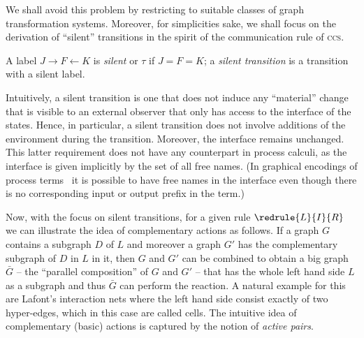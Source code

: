 We shall avoid this problem by restricting to suitable classes of graph transformation systems. 
Moreover, 
for simplicities sake, 
we shall focus on the derivation of ``silent'' transitions
in the spirit of the communication rule of \textsc{ccs}. 
\begin{definition}
  A label $J \to F \gets K$ is \emph{silent} or $\tau$
  if $J = F = K$;
  a \emph{silent transition} is a transition with a silent label. 
\end{definition}
  Intuitively, 
  a silent transition is one that does not induce any ``material''
  change that is visible to an external observer
  that only has access to  the interface of the states. 
  Hence, 
  in particular, 
  a silent transition does not involve additions of the environment
  during the transition.
  Moreover, 
  the interface remains unchanged. 
  This latter requirement does not have any counterpart 
  in process calculi, 
  as the interface is given implicitly by the set of all free names.
  (In graphical encodings of process terms~\cite{bonchi2009labelled}
  it is possible to have free names in the interface
  even though there is no corresponding input or output prefix in
  the term.)



  Now, with the focus on silent transitions,
  for a given rule
  $\redrule{L}{I}{R}$
  we can illustrate the idea of complementary actions as follows.
  If a graph $G$ contains a
  subgraph $D$ of $L$  and moreover a graph $G'$ has the complementary
  subgraph of $D$ in $L$ in it,
  then $G$ and $G'$ can be combined to obtain a
  big graph $\bar G$ -- the ``parallel composition'' of $G$ and $G'$ --
  that has the whole left hand side $L$ as a subgraph
  and thus $\bar G$ can perform the reaction.
  {A natural example for this 
    are Lafont's interaction nets
    where the left hand side consist exactly of two hyper-edges, 
    which in this case are called cells.}
  The intuitive idea of complementary (basic) actions is 
  captured by the notion of \emph{active pairs}. 


